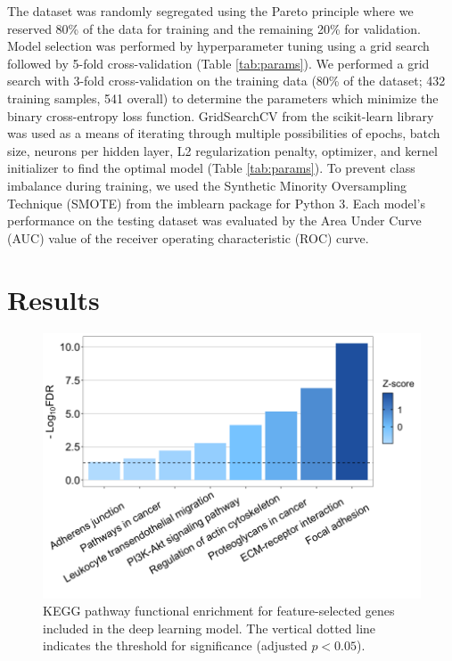 \documentclass[10pt, letterpaper]{article}
\begin{document}
\begin{multicols*}{2}
The dataset was randomly segregated using the Pareto principle \cite{pareto} where we reserved 80\% of the data for training and the remaining 20\% for validation. Model selection was performed by hyperparameter tuning using a grid search followed by 5-fold cross-validation (Table \ref{tab:params}). We performed a grid search with 3-fold cross-validation on the training data (80\% of the dataset; 432 training samples, 541 overall) to determine the parameters which minimize the binary cross-entropy loss function. GridSearchCV from the scikit-learn library \cite{scikit-learn} was used as a means of iterating through multiple possibilities of epochs, batch size, neurons per hidden layer, L2 regularization penalty, optimizer, and kernel initializer to find the optimal model (Table \ref{tab:params}). To prevent class imbalance during training, we used the Synthetic Minority Oversampling Technique (SMOTE) from the imblearn package \cite{imblearn} for Python 3. Each model’s performance on the testing dataset was evaluated by the Area Under Curve (AUC) value of the receiver operating characteristic (ROC) curve.


\section{Results}

\begin{figure}[!ht]
	\centering
	\includegraphics[width=\textwidth]{Figures/kegg.png}
	\caption{KEGG pathway functional enrichment for feature-selected genes included in the deep learning model. The vertical dotted line indicates the threshold for significance (adjusted $p < 0.05$).}
	\label{fig:kegg}
\end{figure}


\end{multicols*}
\end{document}
